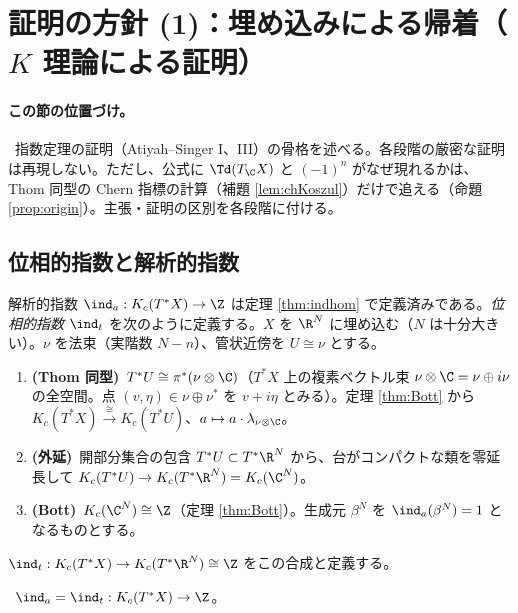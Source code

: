 
\section{証明の方針 (1)：埋め込みによる帰着（$K$ 理論による証明）}\label{sec:proofK}
\paragraph{この節の位置づけ。}\tC\ 指数定理の証明（Atiyah--Singer I、III）の骨格を述べる。各段階の厳密な証明は再現しない。ただし、公式に $\Td(T_{\C}X)$ と $(-1)^n$ がなぜ現れるかは、Thom 同型の Chern 指標の計算（補題 \ref{lem:chKoszul}）だけで追える（命題 \ref{prop:origin}）。主張・証明の区別を各段階に付ける。

\subsection{位相的指数と解析的指数}
解析的指数 $\ind_a:K_c(T^*X)\to\Z$ は定理 \ref{thm:indhom} で定義済みである。\emph{位相的指数} $\ind_t$ を次のように定義する。$X$ を $\R^N$ に埋め込む（$N$ は十分大きい）。$\nu$ を法束（実階数 $N-n$）、管状近傍を $U\cong\nu$ とする。
\begin{enumerate}
\item \textbf{(Thom 同型)}\ $T^*U\cong\pi^*(\nu\otimes\C)$（$T^*X$ 上の複素ベクトル束 $\nu\otimes\C=\nu\oplus i\nu$ の全空間。点 $(v,\eta)\in\nu\oplus\nu^*$ を $v+i\eta$ とみる）。定理 \ref{thm:Bott} から $K_c(T^*X)\xrightarrow{\ \cong\ }K_c(T^*U)$、$a\mapsto a\cdot\lambda_{\nu\otimes\C}$。\tC
\item \textbf{(外延)}\ 開部分集合の包含 $T^*U\subset T^*\R^N$ から、台がコンパクトな類を零延長して $K_c(T^*U)\to K_c(T^*\R^N)=K_c(\C^N)$。
\item \textbf{(Bott)}\ $K_c(\C^N)\cong\Z$（定理 \ref{thm:Bott}）。生成元 $\beta^N$ を $\ind_a(\beta^N)=1$ となるものとする。
\end{enumerate}
$\ind_t:K_c(T^*X)\to K_c(T^*\R^N)\cong\Z$ をこの合成と定義する。
\begin{center}
\end{center}
\begin{thm}\label{thm:indai}\tC\
$\ind_a=\ind_t:K_c(T^*X)\to\Z$。
\end{thm}
